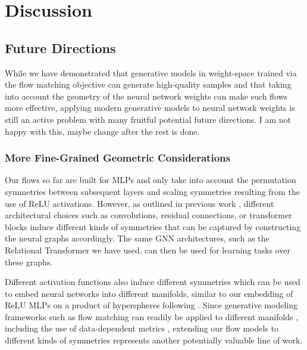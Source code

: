 
\chapter{Discussion}\label{chapter:discussion}

\section{Future Directions}

While we have demonstrated that generative models in weight-space trained via the flow matching objective can generate high-quality samples and that taking into account the geometry of the neural network weights can make such flows more effective, applying modern generative models to neural network weights is still an active problem with many fruitful potential future directions. {\color{cyan} I am not happy with this, maybe change after the rest is done.}

\subsection{More Fine-Grained Geometric Considerations}

Our flows so far are built for MLPs and only take into account the permutation symmetries between subsequent layers and scaling symmetries resulting from the use of ReLU activations. However, as outlined in previous work \citep{kofinasGraphNeuralNetworks2024,limGraphMetanetworksProcessing2023}, different architectural choices such as convolutions, residual connections, or transformer blocks induce different kinds of symmetries that can be captured by constructing the neural graphs accordingly. The same GNN architectures, such as the Relational Transformer we have used, can then be used for learning tasks over these graphs. 

Different activation functions also induce different symmetries \citep{godfreySymmetriesDeepLearning2022} which can be used to embed neural networks into different manifolds, similar to our embedding of ReLU MLPs on a product of hyperspheres following \citep{pittorinoDeepNetworksToroids2022}. Since generative modeling frameworks such as flow matching can readily be applied to different manifolds \citep{chenRiemannianFlowMatching2023}, including the use of data-dependent metrics \citep{kapusniakMetricFlowMatching2024}, extending our flow models to different kinds of symmetries represents another potentially valuable line of work. 

